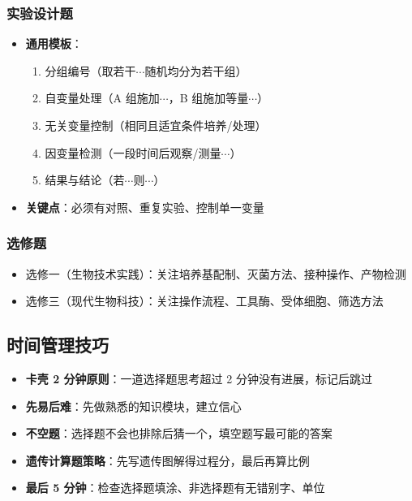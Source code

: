 \subsubsection{实验设计题}

\begin{itemize}
  \item \textbf{通用模板}：
  \begin{enumerate}
    \item 分组编号（取若干$\cdots$随机均分为若干组）
    \item 自变量处理（A 组施加$\cdots$，B 组施加等量$\cdots$）
    \item 无关变量控制（相同且适宜条件培养/处理）
    \item 因变量检测（一段时间后观察/测量$\cdots$）
    \item 结果与结论（若$\cdots$则$\cdots$）
  \end{enumerate}
  \item \textbf{关键点}：必须有对照、重复实验、控制单一变量
\end{itemize}

\subsubsection{选修题}

\begin{itemize}
  \item 选修一（生物技术实践）：关注培养基配制、灭菌方法、接种操作、产物检测
  \item 选修三（现代生物科技）：关注操作流程、工具酶、受体细胞、筛选方法
\end{itemize}

\subsection{时间管理技巧}

\begin{itemize}
  \item \textbf{卡壳 2 分钟原则}：一道选择题思考超过 2 分钟没有进展，标记后跳过
  \item \textbf{先易后难}：先做熟悉的知识模块，建立信心
  \item \textbf{不空题}：选择题不会也排除后猜一个，填空题写最可能的答案
  \item \textbf{遗传计算题策略}：先写遗传图解得过程分，最后再算比例
  \item \textbf{最后 5 分钟}：检查选择题填涂、非选择题有无错别字、单位
\end{itemize}

